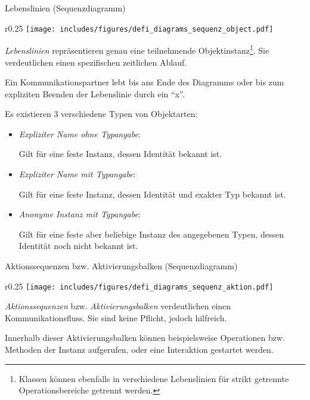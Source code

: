 \begin{diag}{Lebenslinien (Sequenzdiagramm)}
    \begin{wrapfigure}{r}{0.25\textwidth}
        \centering
        \texttt{[image: includes/figures/defi\_diagrams\_sequenz\_object.pdf]}
    \end{wrapfigure}
    \emph{Lebenslinien} repräsentieren genau eine teilnehmende Objektinstanz\footnote{Klassen können ebenfalls in verschiedene Lebenslinien für strikt getrennte Operationsbereiche getrennt werden.}.
    Sie verdeutlichen einen spezifischen zeitlichen Ablauf.

    Ein Kommunikationspartner lebt bis ans Ende des Diagramms oder bis zum expliziten Beenden der Lebenslinie durch ein \enquote{x}.

    Es existieren 3 verschiedene Typen von Objektarten:
    \begin{itemize}
        \item \emph{Expliziter Name ohne Typangabe}:

              Gilt für eine feste Instanz, dessen Identität bekannt ist.
        \item \emph{Expliziter Name mit Typangabe}:

              Gilt für eine feste Instanz, dessen Identität und exakter Typ bekannt ist.
        \item \emph{Anonyme Instanz mit Typangabe}:

              Gilt für eine feste aber beliebige Instanz des angegebenen Typen, dessen Identität noch nicht bekannt ist.
    \end{itemize}
\end{diag}

\begin{diag}{Aktionssequenzen bzw. Aktivierungsbalken (Sequenzdiagramm)}
    \begin{wrapfigure}{r}{0.25\textwidth}
        \centering
        \texttt{[image: includes/figures/defi\_diagrams\_sequenz\_aktion.pdf]}
    \end{wrapfigure}
    \emph{Aktionssequenzen} bzw. \emph{Aktivierungsbalken} verdeutlichen einen Kommunikationsfluss.
    Sie sind keine Pflicht, jedoch hilfreich.

    Innerhalb dieser Aktivierungsbalken können beispielsweise Operationen bzw. Methoden der Instanz aufgerufen, oder eine Interaktion gestartet werden.

    \vspace{1cm}
\end{diag}

